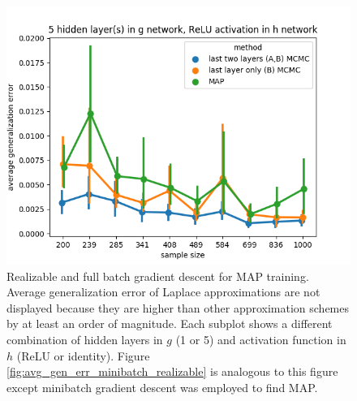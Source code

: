 \documentclass{article} %
\begin{document}
\begin{figure}[h]
\begin{center}
		\includegraphics[scale=0.21]{taskid11.png}
	\end{center}
	\caption{Realizable and full batch gradient descent for MAP training. Average generalization error of Laplace approximations are not displayed because they are higher than other approximation schemes by at least an order of magnitude. Each subplot shows a different combination of hidden layers in $g$ (1 or 5) and activation function in $h$ (ReLU or identity). Figure \ref{fig:avg_gen_err_minibatch_realizable} is analogous to this figure except minibatch gradient descent was employed to find MAP.}
	\label{fig:avg_gen_err_fullbatch_realizable}
\end{figure}

\begin{table}[h]%
	\caption{Companion to Figure \ref{fig:avg_gen_err_fullbatch_realizable}.}
	\label{table:avg_gen_err_fullbatch_realizable}
	\centering
	\begin{tiny}
		\begin{subtable}[t]{2.5in}
			\caption{1 hidden layer(s) in $g$ network, identity activation in $h$ network}			
		\end{subtable}
		\quad
		\begin{subtable}[t]{2.5in}
			\caption{5 hidden layer(s) in $g$ network, identity activation in $h$ network}
			
		\end{subtable}
		\quad
		\begin{subtable}[t]{2.5in}
			\caption{1 hidden layer(s) in $g$ network, ReLU activation in $h$ network}
			
		\end{subtable}
		\quad
		\begin{subtable}[t]{2.5in}
			\caption{5 hidden layer(s) in $g$ network, ReLU activation in $h$ network}			
		\end{subtable}
	\end{tiny}
\end{table}
\end{document}
